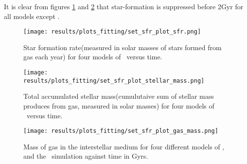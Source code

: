 It is clear from figures \ref{img:fit-v0-sfr} and \ref{img:fit-v0-stellarmass} that star-formation is suppressed before 2Gyr for all models except \vanillaomega.

\begin{figure}[h]
  \centering
  \texttt{[image: results/plots\_fitting/set\_sfr\_plot\_sfr.png]}
  \caption[Star formation rate in \omegamodel\ for \insertion]{\label{img:fit-v0-sfr}
    Star formation rate(measured in solar masses of stars formed from gas each year) for four models of \omegamodel\ versus time. 
  }
\end{figure}
\begin{figure}[h]
  \centering
  \texttt{[image: results/plots\_fitting/set\_sfr\_plot\_stellar\_mass.png]}
  \caption[Stellar mass in \omegamodel\ for \insertion]{\label{img:fit-v0-stellarmass}
    Total accumulated stellar mass(cumulutaive sum of stellar mass produces from gas, measured in solar masses) for four models of \omegamodel\ versus time.
  }
\end{figure}
\begin{figure}[h]
  \centering
  \texttt{[image: results/plots\_fitting/set\_sfr\_plot\_gas\_mass.png]}
  \caption[Gas mass in \omegamodel for \insertion]{\label{img:fit-v0-gasmass}
    Mass of gas in the interstellar medium for four different models of \omegamodel, and the \eris\ simulation against time in Gyrs.
  }
\end{figure}

